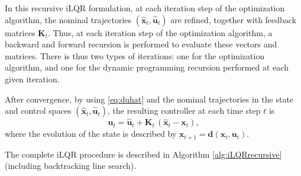 \documentclass[10pt,a4paper]{article} %
\begin{document}
In this recursive iLQR formulation, at each iteration step of the optimization algorithm, the nominal trajectories $(\bm{\hat{x}}_t, \bm{\hat{u}}_t)$ are refined, together with feedback matrices $\bm{K}_t$. Thus, at each iteration step of the optimization algorithm, a backward and forward recursion is performed to evaluate these vectors and matrices. There is thus two types of iterations: one for the optimization algorithm, and one for the dynamic programming recursion performed at each given iteration.

After convergence, by using \eqref{eq:duhat} and the nominal trajectories in the state and control spaces $(\bm{\hat{x}}_t, \bm{\hat{u}}_t)$, the resulting controller at each time step $t$ is
\begin{equation}
	\bm{u}_t = \bm{\hat{u}}_t + \bm{K}_t \, (\bm{\hat{x}}_t - \bm{x}_t),
	\label{eq:iLQRrecursiveController}
\end{equation}
where the evolution of the state is described by $\bm{x}_{t+1}=\bm{d}(\bm{x}_{t},\bm{u}_{t})$.

The complete iLQR procedure is described in Algorithm \ref{alg:iLQRrecursive} (including backtracking line search).


\end{document}
